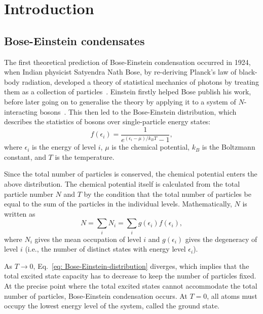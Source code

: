 \chapter{Introduction}\label{chap: intro}


\section{Bose-Einstein condensates}
The first theoretical prediction of Bose-Einstein condensation occurred in 1924,
when Indian physicist Satyendra Nath Bose, by re-deriving Planck's law of
black-body radiation, developed a theory of statistical mechanics of photons
by treating them as a collection of particles~\cite{Bose1924}.
Einstein firstly helped Bose publish his work, before later going on to
generalise the theory by applying it to a system of \(N\)-interacting
bosons~\cite{Einstein1925}.
This then led to the Bose-Einstein distribution, which describes the
statistics of bosons over single-particle energy states:
\begin{equation}\label{eq: Bose-Einstein-distribution}
    f(\epsilon_i) = \frac{1}{e^{(\epsilon_i-\mu)/k_B T} - 1},
\end{equation}
where \(\epsilon_i\) is the energy of level \(i\), \(\mu \) is the chemical
potential, \(k_B\) is the Boltzmann constant, and \(T\) is the temperature.

Since the total number of particles is conserved, the chemical potential enters
the above distribution.
The chemical potential itself is calculated from the total particle number \(N\)
and \(T\) by the condition that the total number of particles be equal to the
sum of the particles in the individual levels.
Mathematically, \(N\) is written as
\begin{equation}
    N = \sum_i N_i = \sum_i g(\epsilon_i)f(\epsilon_i),
\end{equation}
where \(N_i\) gives the mean occupation of level \(i\) and \(g(\epsilon_i)\)
gives the degeneracy of level \(i\) (i.e., the number of distinct states with
energy level \(\epsilon_i\)).

As \(T \rightarrow 0\), Eq.~\eqref{eq: Bose-Einstein-distribution} diverges,
which implies that the total excited state capacity has to decrease to keep
the number of particles fixed.
At the precise point where the total excited states cannot accommodate the total
number of particles, Bose-Einstein condensation occurs.
At \(T=0\), all atoms must occupy the lowest energy level of the system, called
the ground state.

